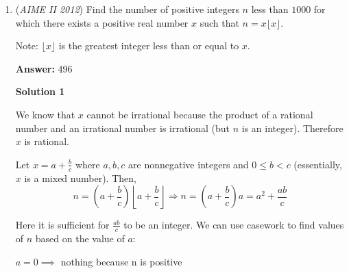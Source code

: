 \begin{enumerate}
 



\textbf{Solution 6}

This is similar to solution 1.

 Define $a = \sin(x)$, $c = \sin(y)$, $b = \cos(x)$, $d= \cos(y)$. Therefore, $\frac{\sin(2x)}{\sin(2y)} = \frac{2ab}{2cd} = \frac{3}{2}$. 

 Now, finding $\frac{\cos(2x)}{\cos(2y)}$ will be harder. Firstly, through definition, $a = 3c$, $2b = d$. In addition, $a^2 + b^2 = 1$ and $c^2 + d^2 = 1$. So, $9c^2 + \frac{d^2}{4} = 1$ and $c^2 + d^2 = 1$. So, $36c^2 + d^2 = 4$ and $c^2 + d^2 = 1$. Therefore, $35c^2 = 3$, and so $c^2 = \frac{3}{35}$. Then, $d^2 = 1-\frac{3}{35} = \frac{32}{35}$. So, $4b^2 = \frac{32}{35}$ and $b^2 = \frac{8}{35}$. The identity $\cos(2x) = 2b^2 - 1$ holds, and similarly, $2d^2 - 1$ holds, so we have $\cos(2x) = -\frac{19}{35}$ and $\cos(2y) = \frac{29}{35}$. Thus the requested value $\frac{\cos(2x)}{\cos(2y)} = -\frac{19}{29}$.

 The requested value is $\frac{3}{2} - \frac{19}{29} = \frac{49}{58} \implies \boxed{107}$.

 


	\item (\textit{AIME II 2012}) Find the number of positive integers $n$ less than $1000$ for which there exists a positive real number $x$ such that $n=x\lfloor x \rfloor$.


 Note: $\lfloor x \rfloor$ is the greatest integer less than or equal to $x$.


 
 \textbf{Answer: }496



\textbf{Solution 1}

We know that $x$ cannot be irrational because the product of a rational number and an irrational number is irrational (but $n$ is an integer). Therefore $x$ is rational.

 
Let $x = a + \frac{b}{c}$ where $a,b,c$ are nonnegative integers and $0 \le b < c$ (essentially, $x$ is a mixed number). Then,
 \[n = \left(a + \frac{b}{c}\right) \left\lfloor a +\frac{b}{c} \right\rfloor \Rightarrow n = \left(a + \frac{b}{c}\right)a = a^2 + \frac{ab}{c}\] 

 Here it is sufficient for $\frac{ab}{c}$ to be an integer. We can use casework to find values of $n$ based on the value of $a$:

 $a = 0 \implies$ nothing because n is positive


\end{enumerate}
